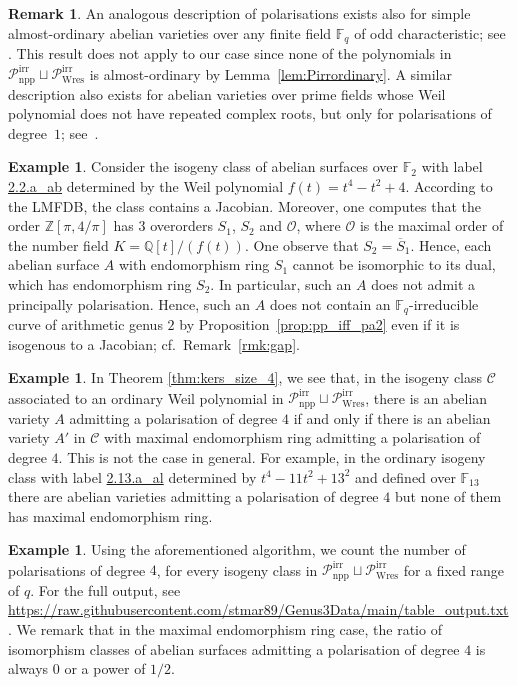 \documentclass[11pt]{amsart}
\newcommand\F{\mathbb{F}}
\newcommand\Fq{\mathbb{F}_q}
\newcommand\Q{\mathbb{Q}}
\newcommand\Z{\mathbb{Z}}
\newcommand\cC{\mathcal{C}}
\newcommand\cO{\mathcal{O}}
\theoremstyle{plain}
\theoremstyle{definition}
\newtheorem{remark}[theorem]{Remark}
\newtheorem{example}[theorem]{Example}
\newcommand\PirrA{\mathcal{P}^\mathrm{irr}_\mathrm{npp}}
\newcommand\PirrB{\mathcal{P}^\mathrm{irr}_\mathrm{Wres}}
\begin{document}
\begin{remark}
    An analogous description of polarisations exists also for simple almost-ordinary abelian varieties over any finite field $\Fq$ of odd characteristic; see \cite{OswalShankar20}.
    This result does not apply to our case since none of the polynomials in $\PirrA\sqcup\PirrB$ is almost-ordinary by Lemma~\ref{lem:Pirrordinary}.
    A similar description also exists for abelian varieties over prime fields whose Weil polynomial does not have repeated complex roots, but only for polarisations of degree~$1$; see~\cite{BergKarMar21}. 
\end{remark}

\begin{example}\label{ex:controesempio}
    Consider the isogeny class of abelian surfaces over $\F_2$ with label \href{http://www.lmfdb.org/Variety/Abelian/Fq/2/2/a_ab}{2.2.a\_ab} determined by the Weil polynomial $f(t)=t^4 -t^2 + 4$.
    According to the LMFDB, the class contains a Jacobian.
    Moreover, one computes that the order $\Z[\pi,4/\pi]$ has $3$ overorders $S_1$, $S_2$ and $\cO$, where $\cO$ is the maximal order of the number field $K=\Q[t]/(f(t))$.
    One observe that $S_2 = \overline{S}_1$.
    Hence, each abelian surface $A$ with endomorphism ring $S_1$ cannot be isomorphic to its dual, which has endomorphism ring $S_2$.
    In particular, such an $A$ does not admit a principally polarisation. 
    Hence, such an $A$ does not contain an $\Fq$-irreducible curve of arithmetic genus $2$ by Proposition~\ref{prop:pp_iff_pa2} even if it is isogenous to a Jacobian; cf.~Remark~\ref{rmk:gap}.
\end{example}

\begin{example}
    In Theorem \ref{thm:kers_size_4}, we see that, in the isogeny class $\cC$ associated to an ordinary Weil polynomial in $\PirrA\sqcup\PirrB$, there is an abelian variety $A$ admitting a polarisation of degree $4$ if and only if there is an abelian variety $A'$ in $\cC$ with maximal endomorphism ring admitting a polarisation of degree $4$.
    This is not the case in general.
    For example, in the ordinary isogeny class with label \href{http://www.lmfdb.org/Variety/Abelian/Fq/2/13/a_al}{2.13.a\_al} determined by $t^4 -11 t^2 + 13^2$ and defined over $\F_{13}$    there are abelian varieties admitting a polarisation of degree $4$ but none of them has maximal endomorphism ring.
\end{example}

\begin{example}\label{ex:table}
    Using the aforementioned algorithm, we count the number of polarisations of degree $4$, for every isogeny class in $\PirrA\sqcup\PirrB$ for a fixed range of $q$.
    For the full output, see \url{https://raw.githubusercontent.com/stmar89/Genus3Data/main/table_output.txt}.
    We remark that in the maximal endomorphism ring case, the ratio of isomorphism classes of abelian surfaces admitting a polarisation of degree $4$ is always $0$ or a power of $1/2$. 
\end{example}
\end{document}
